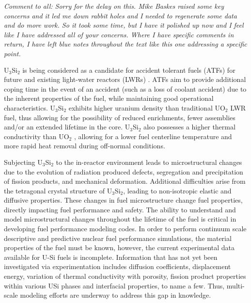 \documentclass[review]{elsarticle}
\begin{document}
\textit{\color{blue}Comment to all: Sorry for the delay on this. Mike Baskes raised some key concerns and it led me down rabbit holes and I needed to regenerate some data and do more work. So it took some time, but I have it polished up now and I feel like I have addressed all of your concerns. Where I have specific comments in return, I have left blue notes throughout the text like this one addressing a specific point. }

U$_{3}$Si$_{2}$ is being considered as a candidate for accident tolerant fuels (ATFs) for future and existing light-water reactors (LWRs) \cite{zinkle2014, zinkle2016}. ATFs aim to provide additional coping time in the event of an accident (such as a loss of coolant accident) due to the inherent properties of the fuel, while maintaining good operational characteristics. U$_{3}$Si$_{2}$ exhibits higher uranium density than traditional UO$_{2}$ LWR fuel, thus allowing for the possibility of reduced enrichments, fewer assemblies and/or an extended lifetime in the core. U$_{3}$Si$_{2}$ also possesses a higher thermal conductivity than UO$_{2}$ \cite{antonio2018}, allowing for a lower fuel centerline temperature and more rapid heat removal during off-normal conditions. 

Subjecting U$_{3}$Si$_{2}$ to the in-reactor environment leads to microstructural changes due to the evolution of radiation produced defects, segregation and precipitation of fission products, and mechanical deformation. Additional difficulties arise from the tetragonal crystal structure of U$_{3}$Si$_{2}$, leading to non-isotropic elastic and diffusive properties. These changes in fuel microstructure change fuel properties, directly impacting fuel performance and safety. The ability to understand and model microstructural changes throughout the lifetime of the fuel is critical in developing fuel performance modeling codes. In order to perform continuum scale descriptive and predictive nuclear fuel performance simulations, the material properties of the fuel must be known, however, the current experimental data available for U-Si fuels is incomplete. Information that has not yet been investigated via experimentation includes diffusion coefficients, displacement energy, variation of thermal conductivity with porosity, fission product properties within various USi phases and interfacial properties, to name a few. Thus, multi-scale modeling efforts are underway to address this gap in knowledge.
\end{document}
